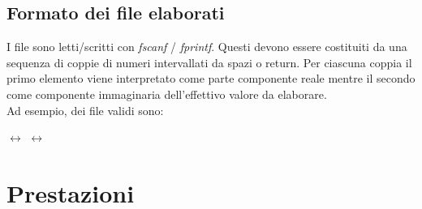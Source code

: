 \documentclass[12pt,a4paper,oneside,openright]{article}
\begin{document}
\subsection{Formato dei file elaborati}
I file sono letti/scritti con \emph{fscanf}  / \emph{fprintf}. Questi devono essere costituiti da una sequenza di coppie di numeri intervallati da spazi o return. Per ciascuna coppia il primo elemento viene interpretato come parte componente reale mentre il secondo come componente immaginaria dell'effettivo valore da elaborare.\\
Ad esempio, dei file validi sono:\\
\begin{center}
 $\longleftrightarrow$ $\longleftrightarrow$  
\end{center}


\section{Prestazioni}
\end{document}
